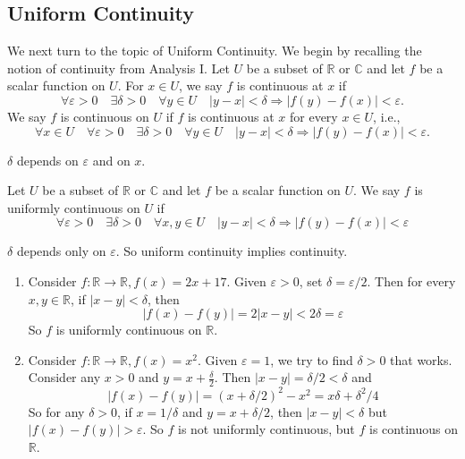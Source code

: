 \documentclass[a4paper]{article}
\begin{document}
\subsection{Uniform Continuity}
We next turn to the topic of Uniform Continuity. We begin by recalling the notion of continuity from Analysis I.
Let $U$ be a subset of $\mathbb{R}$ or $\mathbb{C}$ and let $f$ be a scalar function on $U$. For $x \in U$, we say $f$ is continuous at $x$ if
\[
\forall \varepsilon>0 \quad \exists \delta>0 \quad \forall y \in U \quad|y-x|<\delta \Longrightarrow|f(y)-f(x)|<\varepsilon.
\]
We say $f$ is continuous on $U$ if $f$ is continuous at $x$ for every $x \in U$, i.e.,
\[
    \forall x \in U \quad \forall \varepsilon>0 \quad \exists \delta>0 \quad \forall y \in U \quad|y-x|<\delta \Longrightarrow|f(y)-f(x)|<\varepsilon.
\]
\begin{note}
    $\delta$ depends on $\varepsilon$ and on $x$.
\end{note}

\begin{definition}
    Let $U$ be a subset of $\mathbb{R}$ or $\mathbb{C}$ and let $f$ be a scalar function on $U$. We say $f$ is uniformly continuous on $U$ if
\[
\forall \varepsilon>0 \quad \exists \delta>0 \quad \forall x, y \in U \quad|y-x|<\delta \Longrightarrow|f(y)-f(x)|<\varepsilon
\]
\end{definition}

\begin{note}
    $\delta$ depends only on $\varepsilon$. So uniform continuity implies continuity.
\end{note}

\begin{example}
    \begin{enumerate}
        \item Consider $f: \mathbb{R} \rightarrow \mathbb{R}, f(x)=2x+17$. Given $\varepsilon>0$, set $\delta=\varepsilon / 2$. Then for every $x, y \in \mathbb{R}$, if $|x-y|<\delta$, then
        \[
        |f(x)-f(y)|=2|x-y|<2 \delta=\varepsilon
        \]
        So $f$ is uniformly continuous on $\mathbb{R}$.
        \item Consider $f: \mathbb{R} \rightarrow \mathbb{R}, f(x)=x^{2}$. Given $\varepsilon=1$, we try to find $\delta>0$ that works. Consider any $x>0$ and $y=x+\frac{\delta}{2}$. Then $|x-y|=\delta / 2<\delta$ and
        \[
        |f(x)-f(y)|=(x+\delta / 2)^{2}-x^{2}=x \delta+\delta^{2} / 4
        \]
        So for any $\delta>0$, if $x=1 / \delta$ and $y=x+\delta / 2$, then $|x-y|<\delta$ but $|f(x)-f(y)|>\varepsilon$. So $f$ is not uniformly continuous, but $f$ is continuous on $\mathbb{R}$.
    \end{enumerate}
\end{example}
\end{document}
